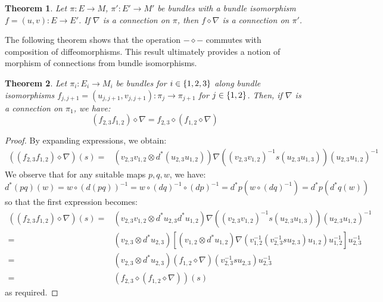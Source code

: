 \documentclass{amsart}
\newcommand{\tensor}{\otimes}
\renewcommand{\to}[1][]{\stackrel{#1}{\longrightarrow}}
\newcommand{\curly}[1]{\left\{ #1 \right\}}
\newcommand{\set}[2][]{\ifthenelse{\equal{#1}{}}
                                  {\curly{#2}}
                                  {\curly{#1\ \textbf{:}\ #2}}}
\newcommand{\sbr}[1]{\left[ #1 \right]}
\newtheorem{thm}{Theorem}
\numberwithin{thm}{section}
\theoremstyle{definition}
\begin{document}
\begin{thm}
Let $\pi : E \to M$, $\pi' : E' \to M'$ be bundles with a bundle isomorphism
$f = (u, v) : E \to E'$. If $\nabla$ is a connection on $\pi$, then
$f \diamond \nabla$ is a connection on $\pi'$.
\end{thm}

The following theorem shows that the operation $- \diamond -$ commutes with
composition of diffeomorphisms. This result ultimately provides a notion of
morphism of connections from bundle isomorphisms.
\begin{thm}
Let $\pi_i : E_i \to M_i$ be bundles
for $i \in \set{1, 2, 3}$ along
bundle isomorphisms
$f_{j, j + 1} = (u_{j, j+ 1}, v_{j, j + 1}) : \pi_{j} \to \pi_{j + 1}$
for $j \in \set{1, 2}$. Then, if $\nabla$ is a connection on $\pi_1$, we have:
\[
  (f_{2, 3}f_{1, 2}) \diamond \nabla
  = f_{2, 3} \diamond (f_{1, 2} \diamond \nabla)
\]
\end{thm}
\begin{proof}
By expanding expressions, we obtain:
\begin{align*}
((f_{2, 3}f_{1, 2}) \diamond \nabla)(s)
=& (v_{2,3}v_{1,2} \tensor d^*(u_{2,3}u_{1,2}))
   \nabla((v_{2, 3}v_{1, 2})^{-1}s(u_{2, 3}u_{1,3}))
   (u_{2,3}u_{1,2})^{-1}
\end{align*}
We observe that for any suitable maps $p, q, w$, we have:
\[
  d^*(pq)(w) = w \circ (d(pq))^{-1}
  = w \circ (dq)^{-1} \circ (dp)^{-1}
  = d^*p(w \circ (dq)^{-1})
  = d^*p(d^*q(w))
\]
so that the first expression becomes:
\begin{align*}
((f_{2, 3}f_{1, 2}) \diamond \nabla)(s)
=& (v_{2,3}v_{1,2} \tensor d^*u_{2,3}d^*u_{1,2})
   \nabla((v_{2, 3}v_{1, 2})^{-1}s(u_{2, 3}u_{1,3}))
   (u_{2,3}u_{1,2})^{-1} \\
=& (v_{2,3} \tensor d^*u_{2,3})\sbr{(v_{1,2} \tensor d^*u_{1,2})
   \nabla(v_{1, 2}^{-1}(v_{2, 3}^{-1}su_{2, 3})u_{1,2})
   u_{1,2}^{-1}}u_{2,3}^{-1} \\
=& (v_{2,3} \tensor d^*u_{2,3})
   (f_{1,2} \diamond \nabla)(v_{2, 3}^{-1}su_{2, 3})
   u_{2,3}^{-1} \\
=& (f_{2,3} \diamond (f_{1,2} \diamond \nabla))(s)
\end{align*}
as required.
\end{proof}
\end{document}
